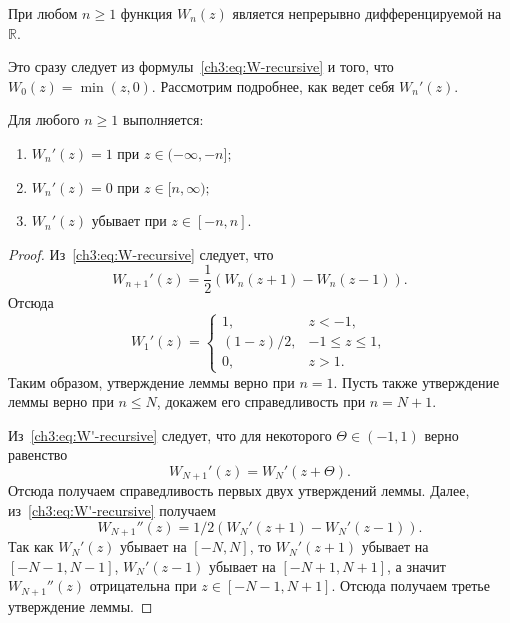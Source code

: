{\begin{proposition}
  При любом $n \geqslant 1$ функция $W_n(z)$ является непрерывно дифференцируемой на $\mathbb{R}$.
\end{proposition}
Это сразу следует из формулы~\eqref{ch3:eq:W-recursive} и того, что $W_0(z) = \min(z, 0)$.
Рассмотрим подробнее, как ведет себя $W_n'(z)$.

\begin{lemma}\label{ch3:lem:W'-props}
  Для любого $n \geqslant 1$ выполняется\textnormal{:}
  \begin{enumerate}
  \item $W_n'(z) = 1$ при $z \in (-\infty, -n];$
  \item $W_n'(z) = 0$ при $z \in [n, \infty);$
  \item $W_n'(z)$ убывает при $z \in [-n, n].$
  \end{enumerate}
\end{lemma}
\begin{proof}
  Из~\eqref{ch3:eq:W-recursive} следует, что
  \begin{equation}\label{ch3:eq:W'-recursive}
    W_{n+1}'(z) = \frac{1}{2} \left( W_n(z + 1) - W_n(z - 1) \right).
  \end{equation}
  Отсюда
  \begin{equation}\label{ch3:eq:W1'}
    W_1'(z) =
    \begin{cases}
      1, &z < -1, \\
      (1-z)/2,  &-1 \leqslant z \leqslant 1, \\
      0, &z > 1.
    \end{cases}
  \end{equation}
  Таким образом, утверждение леммы верно при $n = 1$.
  Пусть также утверждение леммы верно при $n \leqslant N$, докажем его справедливость при $n = N + 1$.

  Из~\eqref{ch3:eq:W'-recursive} следует, что для некоторого $\Theta \in (-1,1)$ верно равенство
  \[
    W_{N+1}'(z) = W_{N}'(z + \Theta).
  \]
  Отсюда получаем справедливость первых двух утверждений леммы.
  Далее, из~\eqref{ch3:eq:W'-recursive} получаем 
  \[
    W_{N+1}''(z) = 1/2 \left( W_{N}'(z + 1) - W_{N}'(z - 1) \right).
  \]
  Так как $W_N'(z)$ убывает на $[-N, N]$, то $W_N'(z + 1)$ убывает на $[-N-1, N - 1]$, $W_N'(z - 1)$ убывает на $[-N + 1, N+1]$, а значит $W_{N+1}''(z)$ отрицательна при $z \in [-N-1, N+1]$.
  Отсюда получаем третье утверждение леммы.
\end{proof}

}

